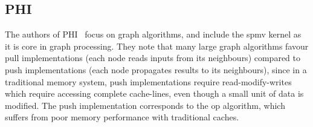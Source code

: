 
\subsection{PHI}
\label{sec:soa:phi}

The authors of PHI~\cite{Mukkara2019_PHI} focus on graph algorithms, and include the \acrshort{spmv} kernel as it is core in graph processing.
They note that many large graph algorithms favour pull implementations (each node reads inputs from its neighbours) compared to push implementations (each node propagates results to its neighbours), since in a traditional memory system, push implementations require read-modify-writes which require accessing complete cache-lines, even though a small unit of data is modified.
The push implementation corresponds to the \acrshort{op} algorithm, which suffers from poor memory performance with traditional caches.

